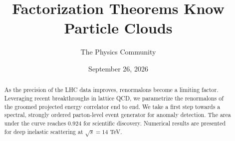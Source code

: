 \documentclass[11pt]{article}
\title{Factorization Theorems Know Particle Clouds}
\author{The Physics Community}
\date{September 26, 2026}
\begin{document}
\maketitle
\begin{abstract}
As the precision of the LHC data improves, renormalons become a limiting
factor. Leveraging recent breakthroughs in lattice QCD, we parametrize
the renormalons of the groomed projected energy correlator end to end.
We take a first step towards a spectral, strongly ordered parton-level
event generator for anomaly detection. The area under the curve reaches
0.924 for scientific discovery. Numerical results are presented for deep
inelastic scattering at $\sqrt{s} = 14$ TeV.
\end{abstract}
\tableofcontents





\nocite{*}


\end{document}
